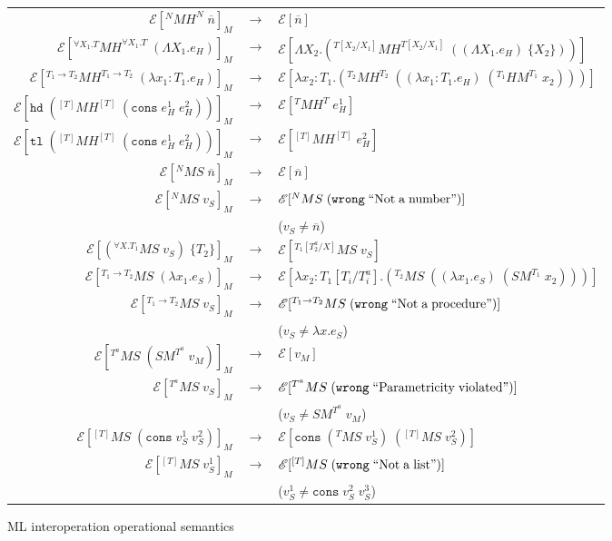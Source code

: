 \begin{figure}
\onehalfspacing
\begin{center}
\begin{tabular}{rcl}
$\mathscr{E}[^{N}MH^{N}\;\overline{n}]_{M}$ & $\rightarrow$ & $\mathscr{E}[\overline{n}]$ \\
$\mathscr{E}[^{\forall X_{1}.T}MH^{\forall X_{1}.T}\;(\Lambda X_{1}.e_{H})]_{M}$ & $\rightarrow$ & $\mathscr{E}[\Lambda X_{2}.(^{T[X_{2}/X_{1}]}MH^{T[X_{2}/X_{1}]}\;((\Lambda X_{1}.e_{H})\;\lbrace X_{2}\rbrace))]$ \\
$\mathscr{E}[^{T_{1}\rightarrow T_{2}}MH^{T_{1}\rightarrow T_{2}}\;(\lambda x_{1}:T_{1}.e_{H})]_{M}$ & $\rightarrow$ & $\mathscr{E}[\lambda x_{2}:T_{1}.(^{T_{2}}MH^{T_{2}}\;((\lambda x_{1}:T_{1}.e_{H})\;(^{T_{1}}HM^{T_{1}}\;x_{2})))]$ \\
$\mathscr{E}[\mathtt{hd}\;(^{[T]}MH^{[T]}\;(\mathtt{cons}\;e_{H}^{1}\;e_{H}^{2}))]_{M}$ & $\rightarrow$ & $\mathscr{E}[^{T}MH^{T}\;e_{H}^{1}]$ \\
$\mathscr{E}[\mathtt{tl}\;(^{[T]}MH^{[T]}\;(\mathtt{cons}\;e_{H}^{1}\;e_{H}^{2}))]_{M}$ & $\rightarrow$ & $\mathscr{E}[^{[T]}MH^{[T]}\;e_{H}^{2}]$ \\
$\mathscr{E}[^{N}MS\;\overline{n}]_{M}$ & $\rightarrow$ & $\mathscr{E}[\overline{n}]$ \\
$\mathscr{E}[^{N}MS\;v_{S}]_{M}$ & $\rightarrow$ & $\mathscr{E}[^{N}MS\;(\mathtt{wrong}\;\mathrm{``Not\;a\;number"})]$ \\
&& ($v_{S}\neq\overline{n}$) \\
$\mathscr{E}[(^{\forall X.T_{1}}MS\;v_{S})\;\lbrace T_{2}\rbrace]_{M}$ & $\rightarrow$ & $\mathscr{E}[^{T_{1}[T^{a}_{2}/X]}MS\;v_{S}]$ \\
$\mathscr{E}[^{T_{1}\rightarrow T_{2}}MS\;(\lambda x_{1}.e_{S})]_{M}$ & $\rightarrow$ & $\mathscr{E}[\lambda x_{2}:T_{1}[T_{i}/T^{a}_{i}].(^{T_{2}}MS\;((\lambda x_{1}.e_{S})\;(SM^{T_{1}}\;x_{2})))]$ \\
$\mathscr{E}[^{T_{1}\rightarrow T_{2}}MS\;v_{S}]_{M}$ & $\rightarrow$ & $\mathscr{E}[^{T_{1}\rightarrow T_{2}}MS\;(\mathtt{wrong}\;\mathrm{``Not\;a\;procedure"})]$ \\
&& ($v_{S}\neq\lambda x.e_{S}$) \\
$\mathscr{E}[^{T^{a}}MS\;(SM^{T^{a}}\;v_{M})]_{M}$ & $\rightarrow$ & $\mathscr{E}[v_{M}]$ \\
$\mathscr{E}[^{T^{a}}MS\;v_{S}]_{M}$ & $\rightarrow$ & $\mathscr{E}[^{T^{a}}MS\;(\mathtt{wrong}\;\mathrm{``Parametricity\;violated"})]$ \\
&& ($v_{S}\neq SM^{T^{a}}\;v_{M}$) \\
$\mathscr{E}[^{[T]}MS\;(\mathtt{cons}\;v_{S}^{1}\;v_{S}^{2})]_{M}$ & $\rightarrow$ & $\mathscr{E}[\mathtt{cons}\;(^{T}MS\;v_{S}^{1})\;(^{[T]}MS\;v_{S}^{2})]$ \\
$\mathscr{E}[^{[T]}MS\;v_{S}^{1}]_{M}$ & $\rightarrow$ & $\mathscr{E}[^{[T]}MS\;(\mathtt{wrong}\;\mathrm{``Not\;a\;list"})]$ \\
&& ($v_{S}^{1}\neq\mathtt{cons}\;v_{S}^{2}\;v_{S}^{3}$)
\end{tabular}
\end{center}
\caption{ML interoperation operational semantics}
\label{fig:mios}
\end{figure}